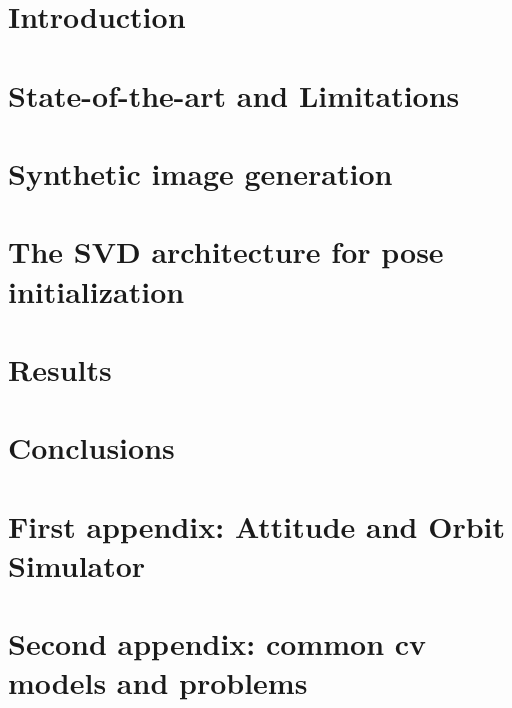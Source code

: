 \documentclass[a4paper,twoside,12pt]{book}
\begin{document}
\clearpage
\printnoidxglossary[type=\acronymtype,title=Abbreviated Terms]

\chapter*{Introduction\label{chap:introduction}}

\cleardoublepage{}

\chapter{State-of-the-art and Limitations\label{chap:first-chapter}}

\cleardoublepage{}
\chapter{Synthetic image generation\label{chap:second-chapter}}

\cleardoublepage{}
\chapter{The SVD architecture for pose initialization\label{chap:third-chapter}}

\cleardoublepage{}
\chapter{Results\label{chap:fourth-chapter}}

\cleardoublepage{}

\chapter*{Conclusions}

\cleardoublepage{}



\cleardoublepage{}

\appendix
\chapter{First appendix: Attitude and Orbit Simulator \label{app:first-appendix}}

\cleardoublepage{}
\chapter{Second appendix: common \acrshort{cv} models and problems \label{app:second-appendix}}

\cleardoublepage{}

\end{document}
